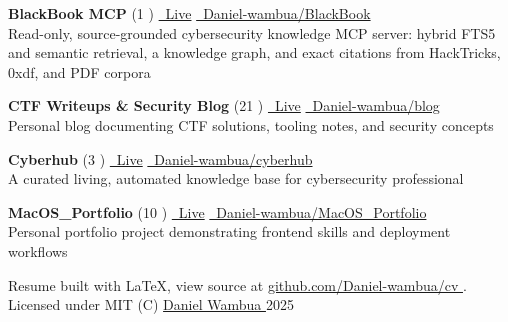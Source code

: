 \documentclass[]{resume-format}
\begin{document}
\vspace{0.2mm}
\begin{cvachievements}
  \setlength{\itemsep}{0mm}
  \item {\hspace{-5pt}
    \textbf{ BlackBook MCP } (1 \raisebox{0.5pt}{\scriptsize\faStar})
    \href{ https://blackbook.havocsec.me }{\scriptsize\color{lightgray}\faExternalLink~Live}
    \hfill
    \href{https://github.com/Daniel-wambua/BlackBook}{\hspace{1pt}\faGithub~Daniel-wambua/BlackBook}\\
    Read-only, source-grounded cybersecurity knowledge MCP server: hybrid FTS5 and semantic retrieval, a knowledge graph, and exact citations from HackTricks, 0xdf, and PDF corpora
    \vspace{0.2mm}
  }
  \item {\hspace{-5pt}
    \textbf{ CTF Writeups \& Security Blog } (21 \raisebox{0.5pt}{\scriptsize\faStar})
    \href{ https://havocsec.dev }{\scriptsize\color{lightgray}\faExternalLink~Live}
    \hfill
    \href{https://github.com/Daniel-wambua/blog}{\hspace{1pt}\faGithub~Daniel-wambua/blog}\\
    Personal blog documenting CTF solutions, tooling notes, and security concepts
    \vspace{0.2mm}
  }
  \item {\hspace{-5pt}
    \textbf{ Cyberhub } (3 \raisebox{0.5pt}{\scriptsize\faStar})
    \href{ https://cyberhub.havocsec.dev }{\scriptsize\color{lightgray}\faExternalLink~Live}
    \hfill
    \href{https://github.com/Daniel-wambua/cyberhub}{\hspace{1pt}\faGithub~Daniel-wambua/cyberhub}\\
    A curated living, automated knowledge base for cybersecurity professional
    \vspace{0.2mm}
  }
  \item {\hspace{-5pt}
    \textbf{ MacOS\_Portfolio } (10 \raisebox{0.5pt}{\scriptsize\faStar})
    \href{ https://macfolio.havocx.me }{\scriptsize\color{lightgray}\faExternalLink~Live}
    \hfill
    \href{https://github.com/Daniel-wambua/MacOS\_Portfolio}{\hspace{1pt}\faGithub~Daniel-wambua/MacOS\_Portfolio}\\
    Personal portfolio project demonstrating frontend skills and deployment workflows
    \vspace{0.2mm}
  }
\end{cvachievements}



\vspace{1.5mm}
\begin{center}
    \tiny\color{lightgray}
    Resume built with LaTeX, view source at
    \href{https://github.com/Daniel-wambua/cv}{ github.com/Daniel-wambua/cv }.
    Licensed under MIT (C)
    \href{https://cv.havocsec.me}{ Daniel Wambua } 2025
\end{center}
\ 
\end{document}
